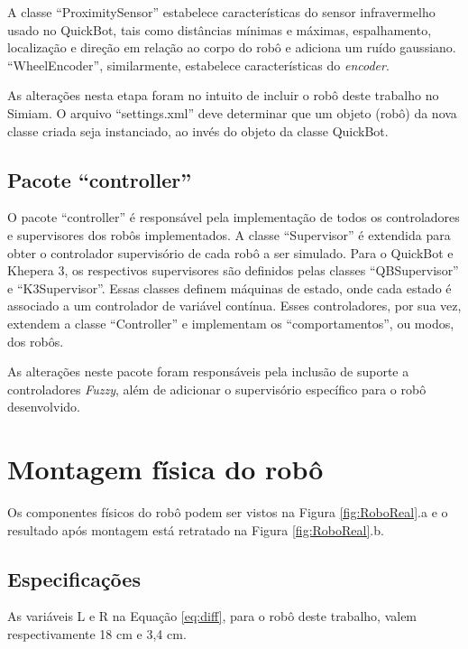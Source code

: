	A classe ``ProximitySensor'' estabelece características do sensor infravermelho
	usado no QuickBot, tais como distâncias mínimas e máximas, espalhamento, localização e
	direção em relação ao corpo do robô e adiciona um ruído gaussiano.
	``WheelEncoder'', similarmente, estabelece características do \textit{encoder}.
	
	As alterações nesta etapa foram no intuito de incluir o robô deste trabalho
	no Simiam. O arquivo ``settings.xml'' deve determinar que um objeto (robô) da
	nova classe criada seja instanciado, ao invés do objeto da classe QuickBot.
	
	\subsection{Pacote ``controller''}
	
	O pacote ``controller'' é responsável pela implementação de todos os
	controladores e supervisores dos robôs implementados. A classe ``Supervisor'' é
	extendida para obter o controlador supervisório de cada robô a ser simulado.
	Para o QuickBot e Khepera 3, os respectivos supervisores são definidos pelas
	classes ``QBSupervisor'' e ``K3Supervisor''. Essas classes definem máquinas de
	estado, onde cada estado é associado a um controlador de variável contínua.
	Esses controladores, por sua vez, extendem a classe ``Controller'' e
	implementam os ``comportamentos'', ou modos, dos robôs.
	
	As alterações neste pacote foram responsáveis pela inclusão de suporte a
	controladores \textit{Fuzzy}, além de adicionar o supervisório específico para
	o robô desenvolvido.
	 
\section{Montagem física do robô}

Os componentes físicos do robô podem ser vistos na Figura \ref{fig:RoboReal}.a e
o resultado após montagem está retratado na Figura \ref{fig:RoboReal}.b.



\subsection{Especificações}

As variáveis L e R na Equação \ref{eq:diff}, para o robô deste trabalho, valem
respectivamente 18 cm e 3,4 cm.


